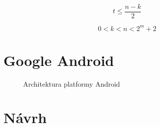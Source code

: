 \begin{equation}
  t \leq \frac{n - k}{2}
\end{equation}

\begin{equation}
  0 < k < n < 2^{m} + 2
\end{equation}
\chapter{Google Android}

\begin{figure}[H]
  \begin{center}
    \caption{Architektura platformy Android}
    \label{AndroidArchitecture}
  \end{center}
\end{figure}

\chapter{Návrh}

